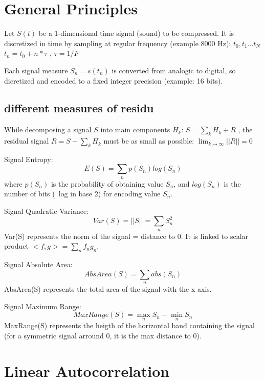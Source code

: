 \documentclass[english]{article}
\begin{document}
\section{General Principles}

Let $S(t)$ be a 1-dimensional time signal (sound) to be compressed.
It is discretized in time by sampling at regular frequency (example 8000 Hz): $t_0, t_1 \ldots t_N$
$t_n = t_0 + n * \tau$ ,   $\tau=1/F$ 

Each signal measure $S_n=s(t_{n})$ is converted from analogic to digital, so dicretized and encoded to a fixed
integer precision (example: 16 bits).


\subsection{different measures of residu}


\noindent While decomposing a signal $S$ into main components $H_k$: $S=\sum_k H_k + R$ , the residual signal $R = S -
\sum_k H_k$ must be as small as possible: $ \lim_{k \rightarrow \infty} ||R|| = 0 $

\noindent Signal Entropy:
\begin{equation}
E(S) = \sum_n p(S_n) log(S_n)
\end{equation}
where $p(S_n)$ is the probability of obtaining value $S_n$, and $log(S_n)$ is the number of bits (~log in base 2) for
encoding value $S_n$.


\noindent Signal Quadratic Variance:
\begin{equation}
Var(S) = ||S|| = \sum_n S_n^2
\end{equation}
Var(S) represents the norm of the signal = distance to 0. It is linked to scalar product $<f,g> = \sum_n f_n g_n$.


\noindent Signal Absolute Area:
\begin{equation}
AbsArea(S) = \sum_n abs(S_n)
\end{equation}
AbsArea(S) represents the total area of the signal with the x-axis. 

\noindent Signal Maximum Range:
\begin{equation}
MaxRange(S) = \max_n S_n - \min_n S_n
\end{equation}
MaxRange(S) represents the heigth of the horizontal band containing the signal (for a symmetric signal arround 0, it
is the max distance to 0).


\section{Linear Autocorrelation}
\end{document}
